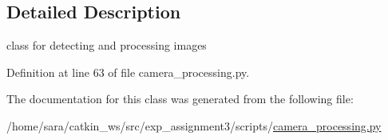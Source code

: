 \subsection{Detailed Description}
class for detecting and processing images 

Definition at line 63 of file camera\+\_\+processing.\+py.



The documentation for this class was generated from the following file\+:\begin{DoxyCompactItemize}
\item 
/home/sara/catkin\+\_\+ws/src/exp\+\_\+assignment3/scripts/\hyperlink{camera__processing_8py}{camera\+\_\+processing.\+py}\end{DoxyCompactItemize}
